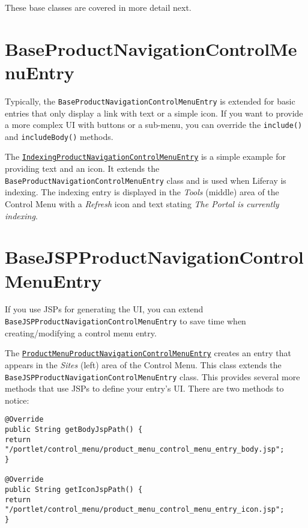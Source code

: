 These base classes are covered in more detail next.

\section{BaseProductNavigationControlMenuEntry}\label{baseproductnavigationcontrolmenuentry}

Typically, the \texttt{BaseProductNavigationControlMenuEntry} is
extended for basic entries that only display a link with text or a
simple icon. If you want to provide a more complex UI with buttons or a
sub-menu, you can override the \texttt{include()} and
\texttt{includeBody()} methods.

The
\href{https://github.com/liferay/liferay-portal/blob/7.2.0-ga1/modules/apps/portal-search/portal-search-web/src/main/java/com/liferay/portal/search/web/internal/product/navigation/control/menu/IndexingProductNavigationControlMenuEntry.java}{\texttt{IndexingProductNavigationControlMenuEntry}}
is a simple example for providing text and an icon. It extends the
\texttt{BaseProductNavigationControlMenuEntry} class and is used when
Liferay is indexing. The indexing entry is displayed in the \emph{Tools}
(middle) area of the Control Menu with a \emph{Refresh} icon and text
stating \emph{The Portal is currently indexing}.

\section{BaseJSPProductNavigationControlMenuEntry}\label{basejspproductnavigationcontrolmenuentry}

If you use JSPs for generating the UI, you can extend
\texttt{BaseJSPProductNavigationControlMenuEntry} to save time when
creating/modifying a control menu entry.

The
\href{https://github.com/liferay/liferay-portal/blob/7.2.0-ga1/modules/apps/product-navigation/product-navigation-product-menu-web/src/main/java/com/liferay/product/navigation/product/menu/web/internal/product/navigation/control/menu/ProductMenuProductNavigationControlMenuEntry.java}{\texttt{ProductMenuProductNavigationControlMenuEntry}}
creates an entry that appears in the \emph{Sites} (left) area of the
Control Menu. This class extends the
\texttt{BaseJSPProductNavigationControlMenuEntry} class. This provides
several more methods that use JSPs to define your entry's UI. There are
two methods to notice:

\begin{verbatim}
@Override
public String getBodyJspPath() {
return "/portlet/control_menu/product_menu_control_menu_entry_body.jsp";
}

@Override
public String getIconJspPath() {
return "/portlet/control_menu/product_menu_control_menu_entry_icon.jsp";
}
\end{verbatim}

